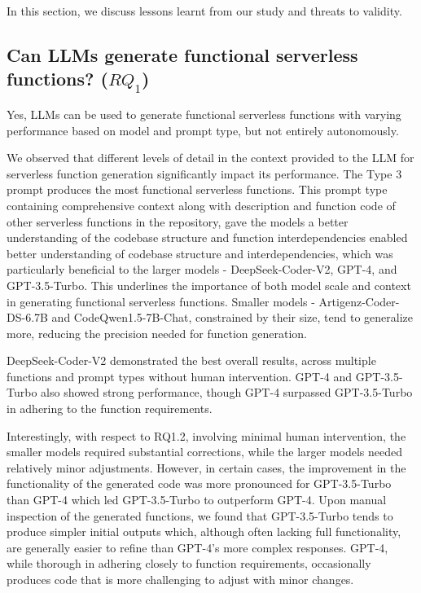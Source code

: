 In this section, we discuss lessons learnt from our study and threats to validity.

\subsection{Can LLMs generate functional serverless functions? ($RQ_1$)}
Yes, LLMs can be used to generate functional serverless functions with varying performance based on model and prompt type, but not entirely autonomously.

We observed that different levels of detail in the context provided to the LLM for serverless function generation significantly impact its performance. The Type 3 prompt produces the most functional serverless functions. This prompt type
containing comprehensive context along with description and function code of other serverless functions in the repository, gave the models a better understanding of the codebase structure and function interdependencies
enabled better understanding of codebase structure and interdependencies, which was particularly beneficial to the larger models - DeepSeek-Coder-V2, GPT-4, and GPT-3.5-Turbo. This underlines the importance of both model scale and context in generating functional serverless functions. Smaller models - Artigenz-Coder-DS-6.7B and CodeQwen1.5-7B-Chat, constrained by their size, tend to generalize more, reducing the precision needed for function generation.

DeepSeek-Coder-V2 demonstrated the best overall results, across multiple functions and prompt types without human intervention. GPT-4 and GPT-3.5-Turbo also showed strong performance, though GPT-4 surpassed GPT-3.5-Turbo in adhering to the function requirements. 

Interestingly, with respect to RQ1.2, involving minimal human intervention, the smaller models required substantial corrections, while the larger models needed relatively minor adjustments. However, in certain cases, the improvement in the functionality of the generated code was more pronounced for GPT-3.5-Turbo than GPT-4 which led GPT-3.5-Turbo to outperform GPT-4. Upon manual inspection of the generated functions, we found that GPT-3.5-Turbo tends to produce simpler initial outputs which, although often lacking full functionality, are generally easier to refine than GPT-4's more complex responses. GPT-4, while thorough in adhering closely to function requirements, occasionally produces code that is more challenging to adjust with minor changes.

